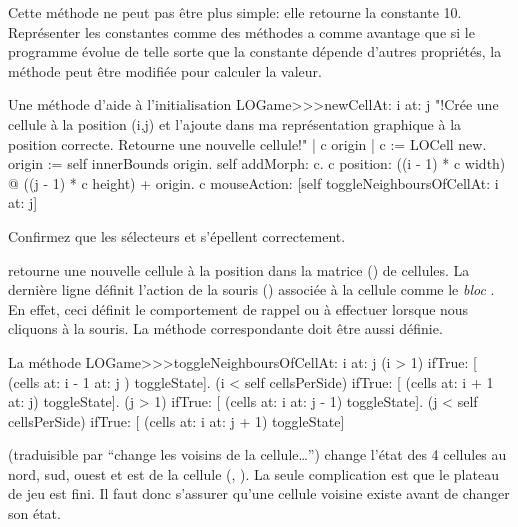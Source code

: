 \documentclass[a4paper,10pt,twoside]{book}
\begin{document}
Cette méthode ne peut pas \^etre plus simple: elle retourne la constante
10. Représenter les constantes comme des méthodes a comme avantage que si le programme évolue de telle sorte que la constante dépende d'autres propriétés, la méthode peut \^etre modifiée pour calculer la valeur.

\begin{method}[newCellAt:at:]{Une méthode d'aide à l'initialisation}
LOGame>>>newCellAt: i at: j
   "!Crée une cellule à la position (i,j) et l'ajoute dans ma représentation graphique à la position correcte. Retourne une nouvelle cellule!"
   | c origin |
   c := LOCell new.
   origin := self innerBounds origin.
   self addMorph: c.
   c position: ((i - 1) * c width) @ ((j - 1) * c height) + origin.
   c mouseAction: [self toggleNeighboursOfCellAt: i at: j]
\end{method}

Confirmez que les sélecteurs  et  s'épellent correctement.

 retourne une nouvelle cellule  à la position  dans la matrice () de cellules.
La dernière ligne définit l'action de la souris () associée à la cellule comme le \emph{bloc}
\mbox{.}
En effet, ceci définit le comportement de rappel ou \callback à effectuer lorsque nous cliquons à la souris.
La méthode correspondante doit \^etre aussi définie.

\begin{method}[toggleNeighboursOfCellAt:at:]{La méthode \callback}
LOGame>>>toggleNeighboursOfCellAt: i at: j
   (i > 1) ifTrue: [ (cells at: i - 1 at: j ) toggleState].
   (i < self cellsPerSide) ifTrue: [ (cells at: i + 1 at: j) toggleState].
   (j > 1) ifTrue: [ (cells at: i  at: j - 1) toggleState].
   (j < self cellsPerSide) ifTrue: [ (cells at: i at: j + 1) toggleState]
\end{method}

 (traduisible par ``change les
voisins de la cellule\ldots'') change l'état des 4 cellules au nord, sud, ouest et est de la cellule (, ). La seule complication est que le plateau de jeu est fini. Il faut donc s'assurer qu'une cellule voisine existe avant de changer son état.
\end{document}
